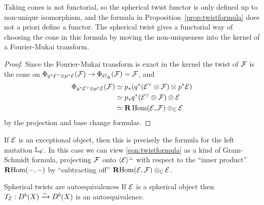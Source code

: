 \begin{remark}{}{}
    Taking cones is not functorial, so the spherical twist functor is only
    defined up to non-unique isomorphism, and the formula in
    Proposition~\ref{prop:twistformula} does not a priori define a functor. The
    spherical twist gives a functorial way of choosing the cone in this formula
    by moving the non-uniqueness into the kernel of a Fourier-Mukai transform.
\end{remark}

\begin{proof}
    Since the Fourier-Mukai transform is exact in the kernel the twist of
    $\mathcal{F}$ is the cone on $\Phi_{q^*\mathcal{E}^\vee\otimes p^*\mathcal{E}}(\mathcal{F})
    \to\Phi_{\mathcal{O}_\Delta}(\mathcal{F})=\mathcal{F}$, and
    \begin{align*}
        \Phi_{q^*\mathcal{E}^\vee\otimes p^*\mathcal{E}}(\mathcal{F})
            &\simeq p_*(q^*(\mathcal{E}^\vee\otimes\mathcal{F})\otimes p^*\mathcal{E}) \\
            &\simeq p_*q^*(\mathcal{E}^\vee\otimes\mathcal{F})\otimes\mathcal{E} \\
            &\simeq \mathbf{R}\operatorname{Hom}(\mathcal{E},\mathcal{F})\otimes_{\mathbb{C}}\mathcal{E}
    \end{align*}
    by the projection and base change formulas.
\end{proof}

\begin{remark}{}{}
    If $\mathcal{E}$ is an exceptional object, then this is precisely the formula for
    the left mutation $\mathbb{L}_{\mathcal{E}}$. In this case we can view
    \eqref{eqn:twistformula} as a kind of Gram-Schmidt formula, projecting
    $\mathcal{F}$ onto $\langle\mathcal{E}\rangle^\perp$ with respect to the ``inner
    product'' $\operatorname{\mathbf{R} Hom}(-,-)$ by ``subtracting off''
    $\operatorname{\mathbf{R} Hom}(\mathcal{E},\mathcal{F})\otimes_{\mathbb{C}}\mathcal{E}$.
\end{remark}


\begin{proposition}{Spherical twists are autoequivalences}{}
    If $\mathcal{E}$ is a spherical object then
    $T_{\mathcal{E}}:D^b(X)\xrightarrow\sim D^b(X)$ is an autoequivalence.
\end{proposition}

